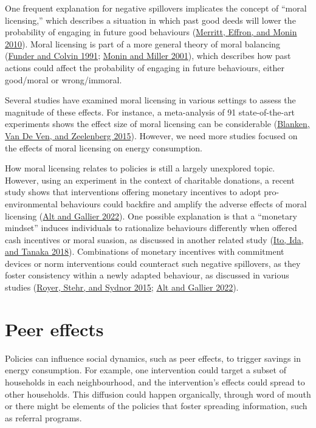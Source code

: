 \documentclass[
  12pt,
  captions=heading]{scrreport}
\begin{document}
One frequent explanation for negative spillovers implicates the concept
of ``moral licensing,'' which describes a situation in which past good
deeds will lower the probability of engaging in future good behaviours
(\protect\hyperlink{ref-merritt2010moral}{Merritt, Effron, and Monin
2010}). Moral licensing is part of a more general theory of moral
balancing (\protect\hyperlink{ref-funder1991explorations}{Funder and
Colvin 1991}; \protect\hyperlink{ref-monin2001moral}{Monin and Miller
2001}), which describes how past actions could affect the probability of
engaging in future behaviours, either good/moral or wrong/immoral.

Several studies have examined moral licensing in various settings to
assess the magnitude of these effects. For instance, a meta-analysis of
91 state-of-the-art experiments shows the effect size of moral licensing
can be considerable (\protect\hyperlink{ref-blanken2015meta}{Blanken,
Van De Ven, and Zeelenberg 2015}). However, we need more studies focused
on the effects of moral licensing on energy consumption.

How moral licensing relates to policies is still a largely unexplored
topic. However, using an experiment in the context of charitable
donations, a recent study shows that interventions offering monetary
incentives to adopt pro-environmental behaviours could backfire and
amplify the adverse effects of moral licensing
(\protect\hyperlink{ref-alt2022incentives}{Alt and Gallier 2022}). One
possible explanation is that a ``monetary mindset'' induces individuals
to rationalize behaviours differently when offered cash incentives or
moral suasion, as discussed in another related study
(\protect\hyperlink{ref-ito2018moral}{Ito, Ida, and Tanaka 2018}).
Combinations of monetary incentives with commitment devices or norm
interventions could counteract such negative spillovers, as they foster
consistency within a newly adapted behaviour, as discussed in various
studies (\protect\hyperlink{ref-royer2015incentives}{Royer, Stehr, and
Sydnor 2015}; \protect\hyperlink{ref-alt2022incentives}{Alt and Gallier
2022}).

\hypertarget{peer-effects}{%
\section{Peer effects}\label{peer-effects}}

Policies can influence social dynamics, such as peer effects, to trigger
savings in energy consumption. For example, one intervention could
target a subset of households in each neighbourhood, and the
intervention's effects could spread to other households. This diffusion
could happen organically, through word of mouth or there might be
elements of the policies that foster spreading information, such as
referral programs.
\end{document}
